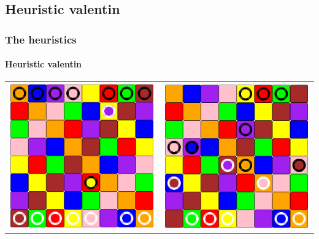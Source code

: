 \documentclass[a4paper, 11pt]{beamer}
\begin{document}
\subsection{Heuristic valentin}

\begin{frame}
\frametitle{The heuristics}
\framesubtitle{Heuristic valentin}
\begin{center}

	\begin{tabular}{c c}
     \includegraphics[scale = 0.12]{val1.png} &
     \pause
     \includegraphics[scale = 0.12]{val2.png}\\
   \end{tabular}
   \end{center}
\end{frame}
\end{document}

